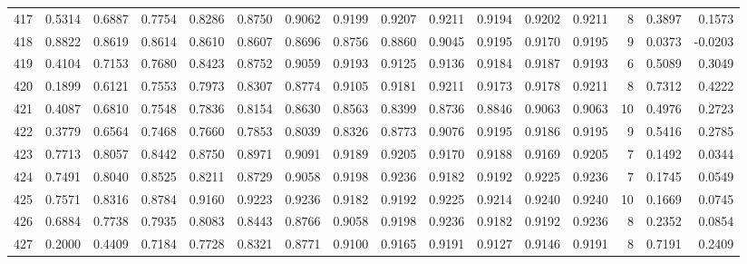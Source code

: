 \begin{tabular}{lrrrrrrrrrrrrrrr}
417 &      0.5314 &  0.6887 &  0.7754 &  0.8286 &  0.8750 &  0.9062 &  0.9199 &  0.9207 &  0.9211 &  0.9194 &   0.9202 &     0.9211 &      8 &                    0.3897 &                     0.1573 \\
418 &      0.8822 &  0.8619 &  0.8614 &  0.8610 &  0.8607 &  0.8696 &  0.8756 &  0.8860 &  0.9045 &  0.9195 &   0.9170 &     0.9195 &      9 &                    0.0373 &                    -0.0203 \\
419 &      0.4104 &  0.7153 &  0.7680 &  0.8423 &  0.8752 &  0.9059 &  0.9193 &  0.9125 &  0.9136 &  0.9184 &   0.9187 &     0.9193 &      6 &                    0.5089 &                     0.3049 \\
420 &      0.1899 &  0.6121 &  0.7553 &  0.7973 &  0.8307 &  0.8774 &  0.9105 &  0.9181 &  0.9211 &  0.9173 &   0.9178 &     0.9211 &      8 &                    0.7312 &                     0.4222 \\
421 &      0.4087 &  0.6810 &  0.7548 &  0.7836 &  0.8154 &  0.8630 &  0.8563 &  0.8399 &  0.8736 &  0.8846 &   0.9063 &     0.9063 &     10 &                    0.4976 &                     0.2723 \\
422 &      0.3779 &  0.6564 &  0.7468 &  0.7660 &  0.7853 &  0.8039 &  0.8326 &  0.8773 &  0.9076 &  0.9195 &   0.9186 &     0.9195 &      9 &                    0.5416 &                     0.2785 \\
423 &      0.7713 &  0.8057 &  0.8442 &  0.8750 &  0.8971 &  0.9091 &  0.9189 &  0.9205 &  0.9170 &  0.9188 &   0.9169 &     0.9205 &      7 &                    0.1492 &                     0.0344 \\
424 &      0.7491 &  0.8040 &  0.8525 &  0.8211 &  0.8729 &  0.9058 &  0.9198 &  0.9236 &  0.9182 &  0.9192 &   0.9225 &     0.9236 &      7 &                    0.1745 &                     0.0549 \\
425 &      0.7571 &  0.8316 &  0.8784 &  0.9160 &  0.9223 &  0.9236 &  0.9182 &  0.9192 &  0.9225 &  0.9214 &   0.9240 &     0.9240 &     10 &                    0.1669 &                     0.0745 \\
426 &      0.6884 &  0.7738 &  0.7935 &  0.8083 &  0.8443 &  0.8766 &  0.9058 &  0.9198 &  0.9236 &  0.9182 &   0.9192 &     0.9236 &      8 &                    0.2352 &                     0.0854 \\
427 &      0.2000 &  0.4409 &  0.7184 &  0.7728 &  0.8321 &  0.8771 &  0.9100 &  0.9165 &  0.9191 &  0.9127 &   0.9146 &     0.9191 &      8 &                    0.7191 &                     0.2409 \\

\end{tabular}
